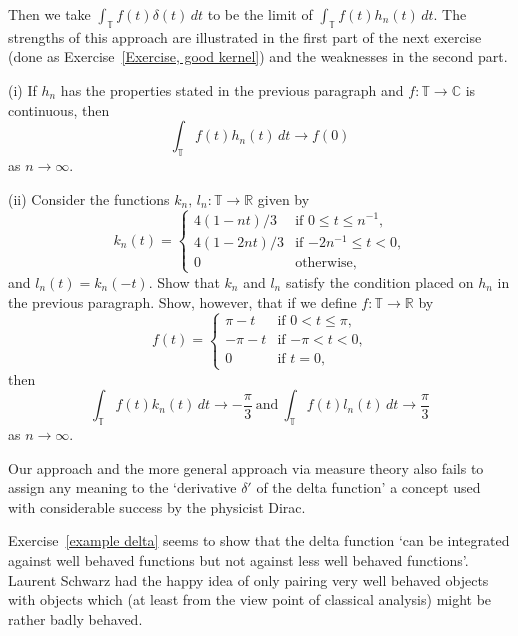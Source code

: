 \noindent Then we take $\int_{\mathbb T} f(t)\delta (t)\,dt$
to be the limit of $\int_{\mathbb T} f(t)h_{n}(t)\,dt$.
The strengths of this approach are illustrated in the first
part of the next exercise (done as Exercise~\ref{Exercise, good kernel})
and the weaknesses in the second part.
\begin{exercise}\label{example delta}
(i) If $h_{n}$ has the properties
stated in the previous paragraph and
$f:{\mathbb T}\rightarrow{\mathbb C}$ is continuous, then
\[\int_{\mathbb T} f(t)h_{n}(t)\,dt\rightarrow f(0)\]
as $n\rightarrow\infty$.

(ii) Consider the functions
$k_{n},\,l_{n}:{\mathbb T}\rightarrow{\mathbb R}$
given by
\begin{equation*}
k_{n}(t)=
\begin{cases}
4(1-nt)/3&\text{if $0\leq t\leq n^{-1}$,}\\
4(1-2nt)/3&\text{if $-2n^{-1}\leq t<0$,}\\
0&\text{otherwise,}
\end{cases}
\end{equation*}
and $l_{n}(t)=k_{n}(-t)$.
Show that $k_{n}$ and $l_{n}$
satisfy the condition placed on $h_{n}$
in the previous paragraph. Show, however,
that if we define $f:{\mathbb T}\rightarrow{\mathbb R}$
by
\begin{equation*}
f(t)=
\begin{cases}
\pi-t&\text{if $0<t\leq \pi$,}\\
-\pi-t&\text{if $-\pi<t<0$,}\\
0&\text{if $t=0$,}
\end{cases}
\end{equation*}
then
\[\int_{\mathbb T} f(t)k_{n}(t)\,dt\rightarrow
-\frac{\pi}{3}\ \text{and}
\ \int_{\mathbb T} f(t)l_{n}(t)\,dt\rightarrow
\frac{\pi}{3}\]
as $n\rightarrow \infty$.
\end{exercise}
Our approach and the more general approach via measure
theory also fails to assign any meaning to the
`derivative $\delta'$ of the delta function' a concept
used with considerable success by the physicist Dirac.

Exercise~\ref{example delta} seems to show that the
delta function `can be integrated against well behaved
functions but not against less well behaved functions'.
Laurent Schwarz had the happy idea of only pairing
very well behaved objects with objects which
(at least from the view point of classical analysis)
might be rather badly behaved.


